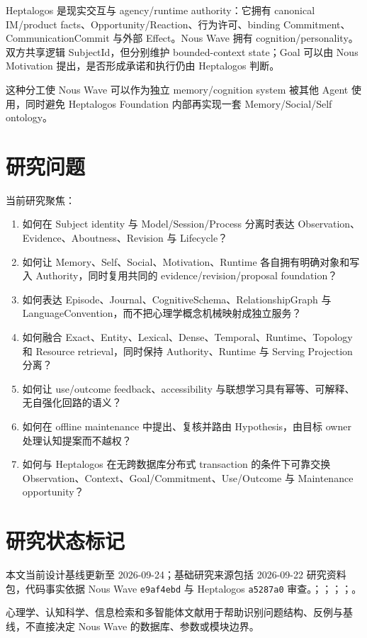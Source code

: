 Heptalogos 是现实交互与 agency/runtime authority：它拥有 canonical IM/product facts、Opportunity/Reaction、行为许可、binding Commitment、CommunicationCommit 与外部 Effect。Nous Wave 拥有 cognition/personality。双方共享逻辑 SubjectId，但分别维护 bounded-context state；Goal 可以由 Nous Motivation 提出，是否形成承诺和执行仍由 Heptalogos 判断。

这种分工使 Nous Wave 可以作为独立 memory/cognition system 被其他 Agent 使用，同时避免 Heptalogos Foundation 内部再实现一套 Memory/Social/Self ontology。

\section{研究问题}

当前研究聚焦：

\begin{enumerate}
\item 如何在 Subject identity 与 Model/Session/Process 分离时表达 Observation、Evidence、Aboutness、Revision 与 Lifecycle？
\item 如何让 Memory、Self、Social、Motivation、Runtime 各自拥有明确对象和写入 Authority，同时复用共同的 evidence/revision/proposal foundation？
\item 如何表达 Episode、Journal、CognitiveSchema、RelationshipGraph 与 LanguageConvention，而不把心理学概念机械映射成独立服务？
\item 如何融合 Exact、Entity、Lexical、Dense、Temporal、Runtime、Topology 和 Resource retrieval，同时保持 Authority、Runtime 与 Serving Projection 分离？
\item 如何让 use/outcome feedback、accessibility 与联想学习具有幂等、可解释、无自强化回路的语义？
\item 如何在 offline maintenance 中提出、复核并路由 Hypothesis，由目标 owner 处理认知提案而不越权？
\item 如何与 Heptalogos 在无跨数据库分布式 transaction 的条件下可靠交换 Observation、Context、Goal/Commitment、Use/Outcome 与 Maintenance opportunity？
\end{enumerate}

\section{研究状态标记}

本文当前设计基线更新至 2026-09-24；基础研究来源包括 2026-09-22 研究资料包，代码事实依据 Nous Wave \texttt{e9af4ebd} 与 Heptalogos \texttt{a5287a0} 审查。；；；；。

心理学、认知科学、信息检索和多智能体文献用于帮助识别问题结构、反例与基线，不直接决定 Nous Wave 的数据库、参数或模块边界。\cite{olson2023,mcadams2006}
